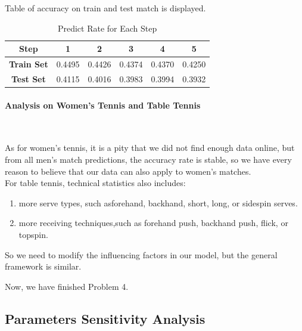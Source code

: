 Table of accuracy on train and test match is displayed.

\begin{table}[H]
    \centering
    \begin{tabular}{cccccc}
        \toprule
        \textbf{Step} & \textbf{1} & \textbf{2} & \textbf{3} & \textbf{4} & \textbf{5} \\
        \midrule
        \textbf{Train Set} & 0.4495 & 0.4426 & 0.4374 & 0.4370 & 0.4250 \\
        \textbf{Test Set} & 0.4115 & 0.4016 & 0.3983 & 0.3994 & 0.3932 \\
        \bottomrule
    \end{tabular}
    \caption{Predict Rate for Each Step}
    \label{tab:predict_rate}
\end{table}

\paragraph{Analysis on Women's Tennis and Table Tennis}~{}

As for women's tennis, it is a pity that we did not find enough data online, but from all men's match predictions, the 
accuracy rate is stable, so we have every reason to believe that our data can also apply to women's matches. \\
For table tennis, technical statistics also includes: 
\begin{enumerate}
    \item more serve types, such asforehand, backhand, short, long, or sidespin serves.
    \item more receiving techniques,such as forehand push, backhand push, flick, or topspin.
\end{enumerate}
So we need to modify the influencing factors in our model, but the general framework is similar.

Now, we have finished Problem 4.

\subsection{Parameters Sensitivity Analysis}